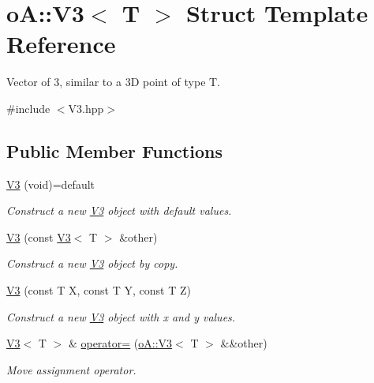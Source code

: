 \hypertarget{structo_a_1_1_v3}{}\section{oA\+:\+:V3$<$ T $>$ Struct Template Reference}
\label{structo_a_1_1_v3}


Vector of 3, similar to a 3D point of type T.  




{\ttfamily \#include $<$V3.\+hpp$>$}

\subsection*{Public Member Functions}
\begin{DoxyCompactItemize}
\item 
\mbox{\hyperlink{structo_a_1_1_v3_af7d2e9a3d4eecae6bdd7adf7dd1a691b}{V3}} (void)=default
\begin{DoxyCompactList}\small\item\em Construct a new \mbox{\hyperlink{structo_a_1_1_v3}{V3}} object with default values. \end{DoxyCompactList}\item 
\mbox{\hyperlink{structo_a_1_1_v3_a8020feb017daf4289ee5f1b06d3ff952}{V3}} (const \mbox{\hyperlink{structo_a_1_1_v3}{V3}}$<$ T $>$ \&other)
\begin{DoxyCompactList}\small\item\em Construct a new \mbox{\hyperlink{structo_a_1_1_v3}{V3}} object by copy. \end{DoxyCompactList}\item 
\mbox{\hyperlink{structo_a_1_1_v3_a528741444df16de6e4839338ec9d2cf0}{V3}} (const T X, const T Y, const T Z)
\begin{DoxyCompactList}\small\item\em Construct a new \mbox{\hyperlink{structo_a_1_1_v3}{V3}} object with x and y values. \end{DoxyCompactList}\item 
\mbox{\hyperlink{structo_a_1_1_v3}{V3}}$<$ T $>$ \& \mbox{\hyperlink{structo_a_1_1_v3_a87a850c59abfbf1ad9fbaa15865e24fe}{operator=}} (\mbox{\hyperlink{structo_a_1_1_v3}{o\+A\+::\+V3}}$<$ T $>$ \&\&other)
\begin{DoxyCompactList}\small\item\em Move assignment operator. \end{DoxyCompactList}\item 

\end{DoxyCompactItemize}
